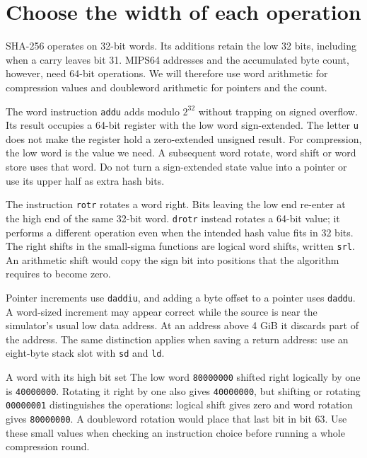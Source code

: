 \section{Choose the width of each operation}
SHA-256 operates on 32-bit words. Its additions retain the low 32 bits, including when
a carry leaves bit 31. MIPS64 addresses and the accumulated byte count, however, need
64-bit operations. We will therefore use word arithmetic for compression values and
doubleword arithmetic for pointers and the count.

The word instruction \texttt{addu} adds modulo \(2^{32}\) without trapping on signed
overflow. Its result occupies a 64-bit register with the low word sign-extended. The
letter \texttt{u} does not make the register hold a zero-extended unsigned result.
For compression, the low word is the value we need. A subsequent word rotate, word
shift or word store uses that word. Do not turn a sign-extended state value into a
pointer or use its upper half as extra hash bits.

The instruction \texttt{rotr} rotates a word right. Bits leaving the low end re-enter
at the high end of the same 32-bit word. \texttt{drotr} instead rotates a 64-bit value;
it performs a different operation even when the intended hash value fits in 32 bits.
The right shifts in the small-sigma functions are logical word shifts, written
\texttt{srl}. An arithmetic shift would copy the sign bit into positions that the
algorithm requires to become zero.

Pointer increments use \texttt{daddiu}, and adding a byte offset to a pointer uses
\texttt{daddu}. A word-sized increment may appear correct while the source is near
the simulator's usual low data address. At an address above 4 GiB it discards part of
the address. The same distinction applies when saving a return address: use an
eight-byte stack slot with \texttt{sd} and \texttt{ld}.

\begin{MARSWorkedExample}{A word with its high bit set}
  The low word \texttt{80000000} shifted right logically by one is \texttt{40000000}.
  Rotating it right by one also gives \texttt{40000000}, but shifting or rotating
  \texttt{00000001} distinguishes the operations: logical shift gives zero and word
  rotation gives \texttt{80000000}. A doubleword rotation would place that last bit in
  bit 63. Use these small values when checking an instruction choice before running a
  whole compression round.
\end{MARSWorkedExample}

